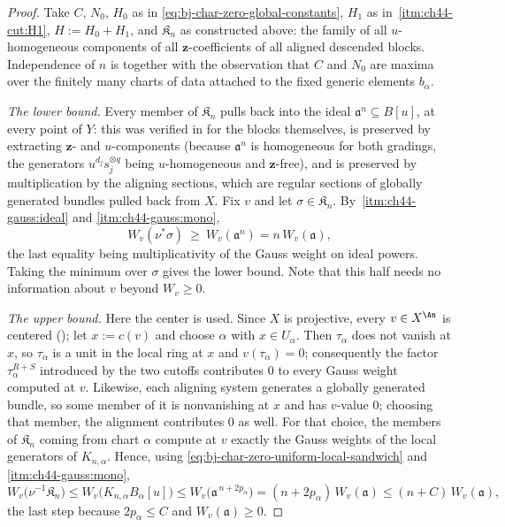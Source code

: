 \begin{proof}
Take $C$, $N_0$, $H_0$ as in
\eqref{eq:bj-char-zero-global-constants}, $H_1$ as in
\,\cref{itm:ch44-cut:H1},
$H:=H_0+H_1$, and $\mathfrak K_n$ as constructed above: the family of
all $u$-homogeneous components of all $\mathbf z$-coefficients of all
aligned descended blocks.  Independence of $n$ is
 together with the observation that $C$ and
$N_0$ are maxima over the finitely many charts of data attached to the
fixed generic elements $b_\alpha$.

\emph{The lower bound.}  Every member of $\mathfrak K_n$ pulls back into
the ideal $\mathfrak a^n\subseteq B[u]$, at every point of $Y$: this was
verified in  for the blocks themselves, is preserved
by extracting $\mathbf z$- and $u$-components (because $\mathfrak a^n$
is homogeneous for both gradings, the generators $u^{d_j}s_j^{\otimes q}$
being $u$-homogeneous and $\mathbf z$-free), and is preserved by
multiplication by the aligning sections, which are regular sections of
globally generated bundles pulled back from $X$.  Fix $v$ and let
$\sigma\in\mathfrak K_n$.  By
\,\cref{itm:ch44-gauss:ideal} and
\cref{itm:ch44-gauss:mono},
\[
 W_v(\nu^*\sigma)\ \ge\ W_v(\mathfrak a^n)=n\,W_v(\mathfrak a),
\]
the last equality being multiplicativity of the Gauss weight on ideal
powers.  Taking the minimum over $\sigma$ gives the lower bound.  Note
that this half needs no information about $v$ beyond $W_v\ge0$.

\emph{The upper bound.}  Here the center is used.  Since $X$ is
projective, every $v\in X^{\An}$ is centered
(); let $x:=c(v)$ and choose
$\alpha$ with $x\in U_\alpha$.  Then $\tau_\alpha$ does not vanish at
$x$, so $\tau_\alpha$ is a unit in the local ring at $x$ and
$v(\tau_\alpha)=0$; consequently the factor $\tau_\alpha^{R+S}$
introduced by the two cutoffs contributes $0$ to every Gauss weight
computed at $v$.  Likewise, each aligning system generates a globally
generated bundle, so some member of it is nonvanishing at $x$ and has
$v$-value $0$; choosing that member, the alignment contributes $0$ as
well.  For that choice, the members of $\mathfrak K_n$ coming from chart
$\alpha$ compute at $v$ exactly the Gauss weights of the local
generators of $K_{n,\alpha}$.  Hence, using
\eqref{eq:bj-char-zero-uniform-local-sandwich} and
\,\cref{itm:ch44-gauss:mono},
\[
 W_v\bigl(\nu^{-1}\mathfrak K_n\bigr)
 \le W_v\bigl(K_{n,\alpha}B_\alpha[u]\bigr)
 \le W_v\bigl(\mathfrak a^{\,n+2p_\alpha}\bigr)
 =(n+2p_\alpha)\,W_v(\mathfrak a)
 \le(n+C)\,W_v(\mathfrak a),
\]
the last step because $2p_\alpha\le C$ and $W_v(\mathfrak a)\ge0$.


\end{proof}
